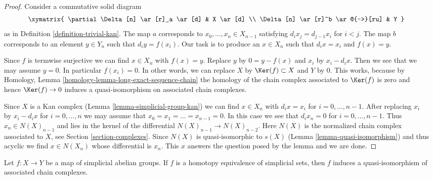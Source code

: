 \begin{proof}
Consider a commutative solid diagram
$$
\xymatrix{
\partial \Delta[n] \ar[r]_a \ar[d] & X \ar[d] \\
\Delta[n] \ar[r]^b \ar@{-->}[ru] & Y
}
$$
as in Definition \ref{definition-trivial-kan}. The map $a$ corresponds
to $x_0, \ldots, x_n \in X_{n - 1}$ satisfying $d_i x_j = d_{j - 1} x_i$
for $i < j$. The map $b$ corresponds to an element $y \in Y_n$ such
that $d_iy = f(x_i)$. Our task is to produce an $x \in X_n$ such that
$d_ix = x_i$ and $f(x) = y$.

\medskip\noindent
Since $f$ is termwise surjective we can find $x \in X_n$ with $f(x) = y$.
Replace $y$ by $0 = y - f(x)$ and $x_i$ by $x_i - d_ix$. Then we
see that we may assume $y = 0$. In particular $f(x_i) = 0$.
In other words, we can replace $X$ by $\Ker(f) \subset X$
and $Y$ by $0$. This works, because by
Homology, Lemma \ref{homology-lemma-long-exact-sequence-chain}
the homology of the chain complex associated to $\Ker(f)$
is zero and hence $\Ker(f) \to 0$ induces a quasi-isomorphism
on associated chain complexes.

\medskip\noindent
Since $X$ is a Kan complex (Lemma \ref{lemma-simplicial-group-kan})
we can find $x \in X_n$ with $d_i x = x_i$ for $i = 0, \ldots, n - 1$.
After replacing $x_i$ by $x_i - d_ix$ for $i = 0, \ldots, n$ we
may assume that $x_0 = x_1 = \ldots = x_{n - 1} = 0$.
In this case we see that $d_i x_n = 0$ for $i = 0, \ldots, n - 1$.
Thus $x_n \in N(X)_{n - 1}$ and lies in the kernel of the differential
$N(X)_{n - 1} \to N(X)_{n - 2}$. Here $N(X)$ is the normalized chain
complex associated to $X$, see Section \ref{section-complexes}.
Since $N(X)$ is quasi-isomorphic to $s(X)$
(Lemma \ref{lemma-quasi-isomorphism})
and thus acyclic we find $x \in N(X_n)$ whose differential is $x_n$.
This $x$ answers the question posed by the lemma and we are done.
\end{proof}

\begin{lemma}
\label{lemma-homotopy-equivalence}
Let $f : X \to Y$ be a map of simplicial abelian groups. If $f$ is a
homotopy equivalence of simplicial sets, then $f$ induces a
quasi-isomorphism of associated chain complexes.
\end{lemma}

